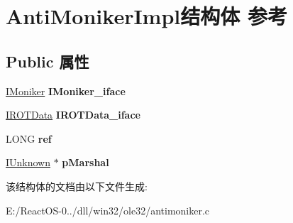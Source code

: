 \hypertarget{struct_anti_moniker_impl}{}\section{Anti\+Moniker\+Impl结构体 参考}
\label{struct_anti_moniker_impl}
\subsection*{Public 属性}
\begin{DoxyCompactItemize}
\item 
\mbox{\label{struct_anti_moniker_impl_adb91baafefd56d9d033771828c9eb47a}} 
\hyperlink{interface_i_moniker}{I\+Moniker} {\bfseries I\+Moniker\+\_\+iface}
\item 
\mbox{\label{struct_anti_moniker_impl_ac20f68ec3c3d48c40037be00e84f59bf}} 
\hyperlink{interface_i_r_o_t_data}{I\+R\+O\+T\+Data} {\bfseries I\+R\+O\+T\+Data\+\_\+iface}
\item 
\mbox{\label{struct_anti_moniker_impl_a7cf8e72a2807df567a060c2a6ca359a7}} 
L\+O\+NG {\bfseries ref}
\item 
\mbox{\label{struct_anti_moniker_impl_a48810aa31dd880578f10f8bbad9d12df}} 
\hyperlink{interface_i_unknown}{I\+Unknown} $\ast$ {\bfseries p\+Marshal}
\end{DoxyCompactItemize}


该结构体的文档由以下文件生成\+:\begin{DoxyCompactItemize}
\item 
E\+:/\+React\+O\+S-\/0../dll/win32/ole32/antimoniker.\+c\end{DoxyCompactItemize}
